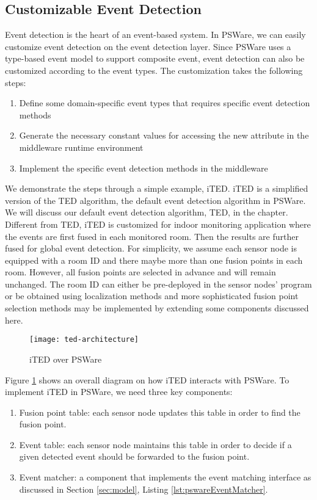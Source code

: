 \subsection{Customizable Event Detection}
Event detection is the heart of an event-based system. In PSWare, we can easily customize event detection on the event detection layer. Since PSWare uses a type-based event model to support composite event, event detection can also be customized according to the event types. The customization takes the following steps:
\begin{enumerate}
\item Define some domain-specific event types that requires specific event detection methods
\item Generate the necessary constant values for accessing the new attribute in the middleware runtime environment
\item Implement the specific event detection methods in the middleware
\end{enumerate}

We demonstrate the steps through a simple example, iTED. iTED is a simplified version of the TED \cite{lai:ted} algorithm, the default event detection algorithm in PSWare. We will discuss our default event detection algorithm, TED, in the chapter. Different from TED, iTED is customized for indoor monitoring application where the events are first fused in each monitored room. Then the results are further fused for global event detection. For simplicity, we assume each sensor node is equipped with a room ID and there maybe more than one fusion points in each room. However, all fusion points are selected in advance and will remain unchanged. The room ID can either be pre-deployed in the sensor nodes' program or be obtained using localization methods and more sophisticated fusion point selection methods may be implemented by extending some components discussed here.

\begin{figure}
\centering
\texttt{[image: ted-architecture]}
\caption{iTED over PSWare}
\label{fig:ted-architecture}
\end{figure}

Figure \ref{fig:ted-architecture} shows an overall diagram on how iTED interacts with PSWare. To implement iTED in PSWare, we need three key components:
\begin{enumerate}
\item Fusion point table: each sensor node updates this table in order to find the fusion point.
\item Event table: each sensor node maintains this table in order to decide if a given detected event should be forwarded to the fusion point.
\item Event matcher: a component that implements the event matching interface as discussed in Section \ref{sec:model}, Listing \ref{lst:pswareEventMatcher}.
\end{enumerate}


